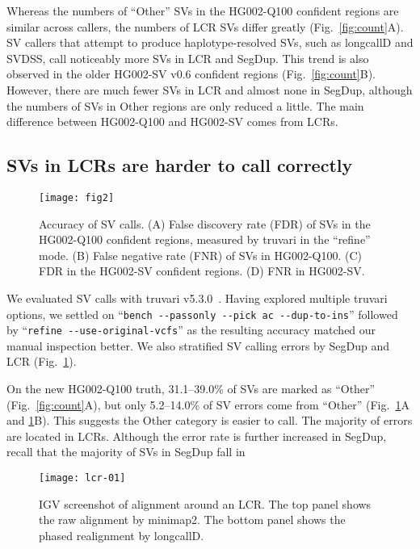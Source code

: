 \documentclass[a4paper,num-refs]{oup-contemporary}
\begin{document}
Whereas the numbers of ``Other'' SVs in the HG002-Q100 confident regions are similar across callers,
the numbers of LCR SVs differ greatly (Fig.~\ref{fig:count}A).
SV callers that attempt to produce haplotype-resolved SVs, such as longcallD and SVDSS, call noticeably more SVs in LCR and SegDup.
This trend is also observed in the older HG002-SV v0.6 confident regions (Fig.~\ref{fig:count}B).
However, there are much fewer SVs in LCR and almost none in SegDup, although the numbers of SVs
in Other regions are only reduced a little.
The main difference between HG002-Q100 and HG002-SV comes from LCRs.

\subsection{SVs in LCRs are harder to call correctly}

\begin{figure}[!tb]
\texttt{[image: fig2]}
\caption{Accuracy of SV calls.
(A) False discovery rate (FDR) of SVs in the HG002-Q100 confident regions, measured by truvari in the ``refine'' mode.
(B) False negative rate (FNR) of SVs in HG002-Q100.
(C) FDR in the HG002-SV confident regions.
(D) FNR in HG002-SV.}\label{fig:acc}
\end{figure}

We evaluated SV calls with truvari v5.3.0~\cite{English:2022aa}.
Having explored multiple truvari options,
we settled on ``{\tt bench -{}-passonly -{}-pick ac -{}-dup-to-ins}''
followed by ``{\tt refine -{}-use-original-vcfs}''
as the resulting accuracy matched our manual inspection better.
We also stratified SV calling errors by SegDup and LCR (Fig.~\ref{fig:acc}).

On the new HG002-Q100 truth, 31.1--39.0\% of SVs are marked as ``Other'' (Fig.~\ref{fig:count}A),
but only 5.2--14.0\% of SV errors come from ``Other'' (Fig.~\ref{fig:acc}A and \ref{fig:acc}B).
This suggests the Other category is easier to call.
The majority of errors are located in LCRs.
Although the error rate is further increased in SegDup,
recall that the majority of SVs in SegDup fall in 

\begin{figure}[tb]
\texttt{[image: lcr-01]}
\caption{IGV screenshot of alignment around an LCR.
The top panel shows the raw alignment by minimap2.
The bottom panel shows the phased realignment by longcallD.
}\label{fig:ex}
\end{figure}
\end{document}

